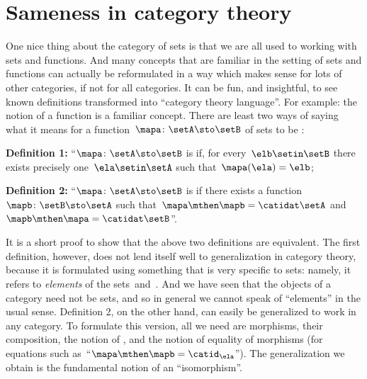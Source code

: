 
\section{Sameness in category theory}
\label{sec:attributes_sameness}

One nice thing about the category of sets is that we are all used to working with sets and functions.
And many concepts that are familiar in the setting of sets and functions can actually be reformulated in a way which makes sense for lots of other categories, if not for all categories.
It can be fun, and insightful, to see known definitions transformed into ``category theory language''.
For example: the notion of a  function is a familiar concept.
There are least two ways of saying what it means for a function~$\mapa \colon \setA \sto \setB$ of sets to be :

\textbf{Definition 1:} ``$\mapa \colon \setA \sto \setB$ is  if, for every~$\elb \setin \setB$ there exists precisely one~$\ela \setin \setA$ such that~$\mapa(\ela) = \elb$;

\textbf{Definition 2:} ``$\mapa \colon \setA \sto \setB$ is  if there exists a function~$\mapb\colon \setB \sto \setA$ such that~$\mapa \mthen \mapb = \catidat\setA$ and~$\mapb \mthen \mapa = \catidat\setB$''.

It is a short proof to show that the above two definitions are equivalent.
The first definition, however, does not lend itself well to generalization in category theory, because it is formulated using something that is very specific to sets: namely, it refers to \emph{elements} of the sets~\setA and~\setB.
And we have seen that the objects of a category need not be sets, and so in general we cannot speak of ``elements'' in the usual sense.
Definition 2, on the other hand, can easily be generalized to work in any category.
To formulate this version, all we need are morphisms, their composition, the notion of , and the notion of equality of morphisms (for equations such as~``$\mapa \mthen \mapb= \catid_\ela$'').
The generalization we obtain is the fundamental notion of an ``isomorphism''.


